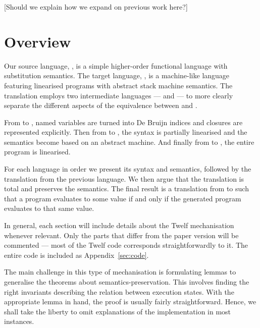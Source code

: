 [Should we explain how we expand on previous work here?]



\section{Overview}

Our source language, \hlang, is a simple higher-order functional language with substitution semantics.
The target language, \mlang, is a machine-like language featuring linearised programs with abstract stack machine semantics.
The translation employs two intermediate languages --- \blang and \slang --- to more clearly separate the different aspects of the equivalence between \hlang and \mlang.

From \hlang to \blang, named variables are turned into De Bruijn indices and closures are represented explicitly.
Then from \blang to \slang, the syntax is partially linearised and the semantics become based on an abstract machine.
And finally from \slang to \mlang, the entire program is linearised.

For each language in order we present its syntax and semantics, followed by the translation from the previous language.
We then argue that the translation is total and preserves the semantics.
The final result is a translation from \hlang to \mlang such that a \hlang program evaluates to some value if and only if the generated \mlang program evaluates to that same value.

In general, each section will include details about the Twelf mechanisation whenever relevant.
Only the parts that differ from the paper version will be commented --- most of the Twelf code corresponds straightforwardly to it.
The entire code is included as Appendix~\ref{sec:code}.

The main challenge in this type of mechanisation is formulating lemmas to generalise the theorems about semantics-preservation.
This involves finding the right invariants describing the relation between execution states.
With the appropriate lemma in hand, the proof is usually fairly straightforward.
Hence, we shall take the liberty to omit explanations of the implementation in most instances.
